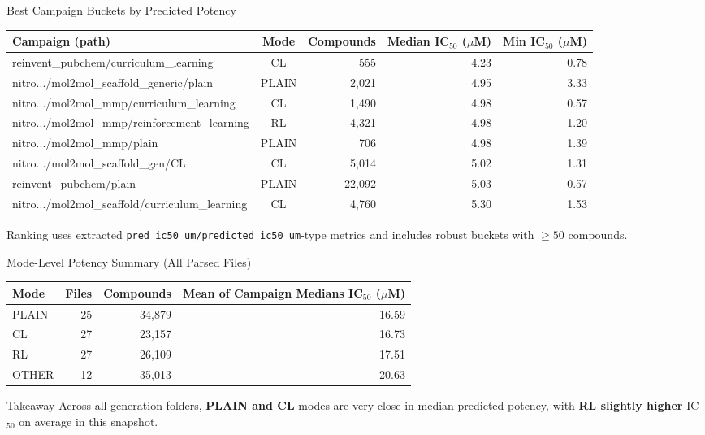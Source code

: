 \documentclass[aspectratio=169]{beamer}
\begin{document}
\begin{frame}{Best Campaign Buckets by Predicted Potency}
  \scriptsize
  \centering
  \begin{tabularx}{\textwidth}{>{\raggedright\arraybackslash}X c r r r}
    \toprule
    \textbf{Campaign (path)} & \textbf{Mode} & \textbf{Compounds} & \textbf{Median IC$_{50}$ ($\mu$M)} & \textbf{Min IC$_{50}$ ($\mu$M)} \\
    \midrule
    reinvent\_pubchem/curriculum\_learning & CL & 555 & 4.23 & 0.78 \\
    nitro.../mol2mol\_scaffold\_generic/plain & PLAIN & 2,021 & 4.95 & 3.33 \\
    nitro.../mol2mol\_mmp/curriculum\_learning & CL & 1,490 & 4.98 & 0.57 \\
    nitro.../mol2mol\_mmp/reinforcement\_learning & RL & 4,321 & 4.98 & 1.20 \\
    nitro.../mol2mol\_mmp/plain & PLAIN & 706 & 4.98 & 1.39 \\
    nitro.../mol2mol\_scaffold\_gen/CL & CL & 5,014 & 5.02 & 1.31 \\
    reinvent\_pubchem/plain & PLAIN & 22,092 & 5.03 & 0.57 \\
    nitro.../mol2mol\_scaffold/curriculum\_learning & CL & 4,760 & 5.30 & 1.53 \\
    \bottomrule
  \end{tabularx}

  \vspace{0.4em}
  {\footnotesize Ranking uses extracted \texttt{pred\_ic50\_um/predicted\_ic50\_um}-type metrics and includes robust buckets with $\geq 50$ compounds.}
\end{frame}

\begin{frame}{Mode-Level Potency Summary (All Parsed Files)}
  \small
  \centering
  \begin{tabular}{lrrr}
    \toprule
    \textbf{Mode} & \textbf{Files} & \textbf{Compounds} & \textbf{Mean of Campaign Medians IC$_{50}$ ($\mu$M)} \\
    \midrule
    PLAIN & 25 & 34,879 & 16.59 \\
    CL & 27 & 23,157 & 16.73 \\
    RL & 27 & 26,109 & 17.51 \\
    OTHER & 12 & 35,013 & 20.63 \\
    \bottomrule
  \end{tabular}

  \vspace{0.8em}
  \begin{block}{Takeaway}
    Across all generation folders, \textbf{PLAIN and CL} modes are very close in median predicted potency, with \textbf{RL slightly higher} IC$_{50}$ on average in this snapshot.
  \end{block}
\end{frame}
\end{document}
